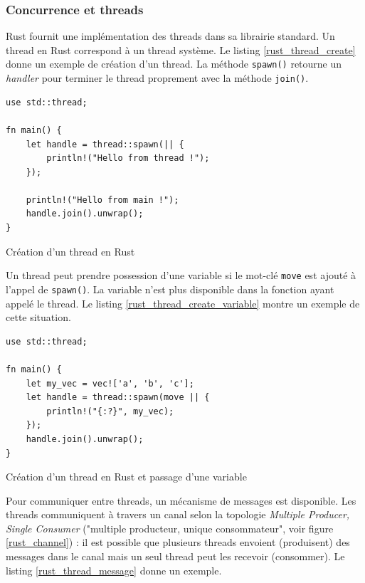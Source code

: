 \documentclass[a4paper, 12pt]{article}
\newenvironment{code}{\captionsetup{type=listing}}{}
\begin{document}
\subsubsection{Concurrence et threads}
Rust fournit une implémentation des threads dans sa librairie standard. Un thread en Rust 
correspond à un thread système. Le listing \ref{rust_thread_create} donne un exemple de création 
d'un thread. La méthode \texttt{spawn()} retourne un \textit{handler} pour terminer le 
thread proprement avec la méthode \texttt{join()}.
\bigbreak
\begin{code}
    \begin{verbatim}
use std::thread;

fn main() {
    let handle = thread::spawn(|| {
        println!("Hello from thread !");
    });
    
    println!("Hello from main !");
    handle.join().unwrap();
}
    \end{verbatim}
    \caption{Création d'un thread en Rust}
    \label{rust_thread_create}
\end{code}
\bigbreak
Un thread peut prendre possession d'une variable si le mot-clé \texttt{move} est ajouté à 
l'appel de \texttt{spawn()}. La variable n'est plus disponible dans la fonction ayant 
appelé le thread. Le listing \ref{rust_thread_create_variable} montre un exemple de cette situation.
\bigbreak
\begin{code}
    \begin{verbatim}
use std::thread;

fn main() {
    let my_vec = vec!['a', 'b', 'c'];
    let handle = thread::spawn(move || {
        println!("{:?}", my_vec);
    });
    handle.join().unwrap();
}
    \end{verbatim}
    \caption{Création d'un thread en Rust et passage d'une variable}
    \label{rust_thread_create_variable}
\end{code}
\bigbreak
Pour communiquer entre threads, un mécanisme de messages est disponible. Les threads communiquent à 
travers un canal selon la topologie \textit{Multiple Producer, Single Consumer} ("multiple producteur, 
unique consommateur", voir figure \ref{rust_channel}) : il est possible que plusieurs threads 
envoient (produisent) des messages dans le canal mais un seul thread peut les recevoir (consommer). 
Le listing \ref{rust_thread_message} donne un exemple.
\end{document}
